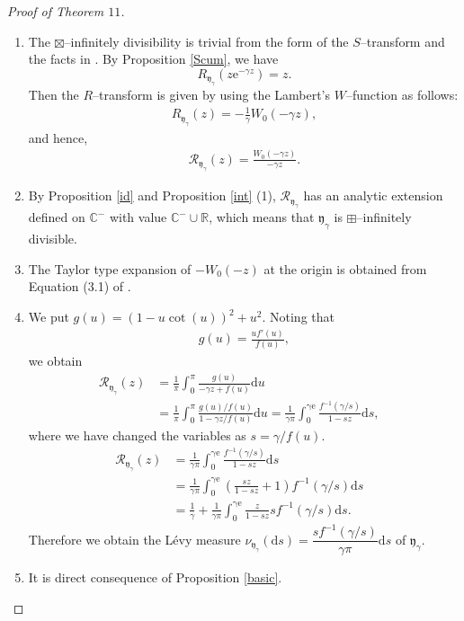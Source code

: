 \documentclass[12pt]{amsart}
\theoremstyle{definition}
\numberwithin{equation}{section}
\begin{document}
\begin{proof}[Proof of Theorem $11$]
\begin{enumerate}[{\rm (1)}]
\item
The $\boxtimes$--infinitely divisibility is trivial from the form of the $S$--transform and the facts in \cite{BeVo92}.
By Proposition \ref{Scum}, we have 
\[
R_{\mathfrak{y}_{\gamma}}(z\mathrm{e}^{-\gamma z})=z.
\]
Then the $R$--transform is given by using the Lambert's $W$--function as follows:
\begin{align*}
R_{\mathfrak{y}_{\gamma}}(z)=-\frac{1}{\gamma}W_{0}(-\gamma z), 
\end{align*}
and hence,
\begin{align*}
\mathcal{R}_{\mathfrak{y}_{\gamma}}(z)=\frac{W_{0}(-\gamma z)}{-\gamma z}. 
\end{align*}
\item
By Proposition \ref{id} and Proposition \ref{int} (1), 
$\mathcal{R}_{\mathfrak{y}_{\gamma}}$ has an analytic extension defined on ${\mathbb{C}}^{-}$ with value ${\mathbb{C}}^- \cup {\mathbb{R}}$,
which means that $\mathfrak{y}_{\gamma}$ is $\boxplus$--infinitely divisible.

\item
The Taylor type expansion of $-W_{0}(-z)$ at the origin 
is obtained from Equation (3.1) of \cite[pp. 339]{Cetc96}.

\item 
We put
$g(u)=(1-u\cot (u))^2+u^2$.
Noting that
\begin{align}\label{g}
g(u) = \frac{uf'(u)}{f(u)},
\end{align}
we obtain
\begin{align*}
\mathcal{R}_{\mathfrak{y}_{\gamma}}(z)
&= \frac{1}{\pi}\int_{0}^{\pi}\frac{g(u)}{-\gamma z+f(u)}{\mathrm d}u&\\
&= \frac{1}{\pi}\int_{0}^{\pi}\frac{g(u)/f(u)}{1-\gamma z/f(u)}{\mathrm d}u
= \frac{1}{\gamma \pi}\int_{0}^{\mathrm{\gamma e}}\frac{f^{-1}(\gamma/s)}{1-sz}
{\mathrm d}s,&
\end{align*}
where we have changed the variables as $s=\gamma/f(u)$.
\begin{align*}
\mathcal{R}_{\mathfrak{y}_{\gamma}}(z)
&= \frac{1}{\gamma \pi}\int_{0}^{\mathrm{\gamma e}}\frac{f^{-1}(\gamma/s)}{1-sz}{\mathrm d}s&\\
&= \frac{1}{\gamma \pi}
\int_{0}^{\mathrm{\gamma e}}
\left(
\frac{sz}{1-sz}+1
\right)
f^{-1}(\gamma/s){\mathrm d}s&\\
&= \frac{1}{\gamma}+ \frac{1}{\gamma \pi}
\int_{0}^{\mathrm{\gamma e}}
\frac{z}{1-sz}
sf^{-1}(\gamma/s){\mathrm d}s.&
\end{align*}
Therefore we obtain the L\'evy measure 
$\nu_{\mathfrak{y}_{\gamma}}({\mathrm d}s)=\dfrac{sf^{-1}(\gamma /s)}{\gamma\pi}{\mathrm d}s$ of $\mathfrak{y}_{\gamma}$.

\item It is direct consequence of Proposition \ref{basic}.
\end{enumerate}
\end{proof}
\end{document}
